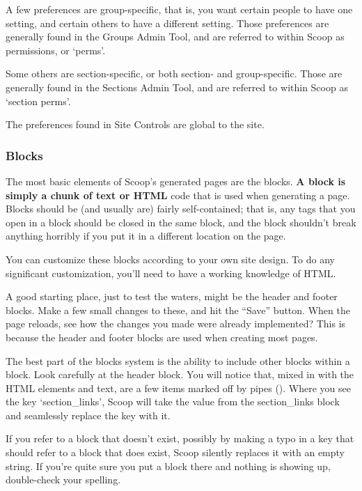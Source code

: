 A few preferences are group-specific, that is, you want certain people to have one setting, and certain others to have a different setting.  Those preferences are generally found in the Groups Admin Tool, and are referred to within Scoop as permissions, or `perms'.

Some others are section-specific, or both section- and group-specific.  Those are generally found in the Sections Admin Tool, and are referred to within Scoop as `section perms'.

The preferences found in Site Controls are global to the site.

\subsubsection{Blocks}
\label{how-blocks}

The most basic elements of Scoop's generated pages are the blocks.  {\bf A block is simply a chunk of text or HTML} code that is used when generating a page.  Blocks should be (and usually are) fairly self-contained; that is, any tags that you open in a block should be closed in the same block, and the block shouldn't break anything horribly if you put it in a different location on the page.

You can customize these blocks according to your own site design.  To do any significant customization, you'll need to have a working knowledge of HTML.

A good starting place, just to test the waters, might be the header and footer blocks.  Make a few small changes to these, and hit the ``Save'' button.  When the page reloads, see how the changes you made were already implemented?  This is because the header and footer blocks are used when creating most pages.

The best part of the blocks system is the ability to include other blocks within a block.  Look carefully at the header block.  You will notice that, mixed in with the HTML elements and text, are a few items marked off by pipes (\latexhtml{$\vert$}{|}).  Where you see the key `\latexhtml{$\vert$}{|}section\_links\latexhtml{$\vert$}{|}', Scoop will take the value from the section\_links block and seamlessly replace the key with it.

If you refer to a block that doesn't exist, possibly by making a typo in a key that should refer to a block that does exist, Scoop silently replaces it with an empty string.  If you're quite sure you put a block there and nothing is showing up, double-check your spelling.


